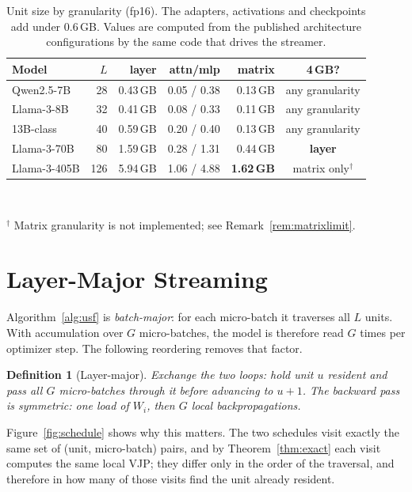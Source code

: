\documentclass[preprint,12pt]{elsarticle}
\newtheorem{definition}[theorem]{Definition}
\begin{document}
\begin{table}[t]
\centering
\caption{Unit size by granularity (fp16). The adapters, activations and checkpoints add under
0.6\,GB. Values are computed from the published architecture configurations by the same code that
drives the streamer.}
\label{tab:scaling}
\footnotesize
\setlength{\tabcolsep}{4pt}
\begin{tabular}{@{}lrrrrc@{}}
\toprule
\textbf{Model} & $L$ & \textbf{layer} & \textbf{attn/mlp} & \textbf{matrix} & \textbf{4\,GB?} \\
\midrule
Qwen2.5-7B    & 28  & 0.43\,GB & 0.05 / 0.38 & 0.13\,GB & any granularity \\
Llama-3-8B    & 32  & 0.41\,GB & 0.08 / 0.33 & 0.11\,GB & any granularity \\
13B-class     & 40  & 0.59\,GB & 0.20 / 0.40 & 0.13\,GB & any granularity \\
Llama-3-70B   & 80  & 1.59\,GB & 0.28 / 1.31 & 0.44\,GB & \textbf{layer} \\
Llama-3-405B  & 126 & 5.94\,GB & 1.06 / 4.88 & \textbf{1.62\,GB} & matrix only$^\dagger$ \\
\bottomrule
\end{tabular}
\\[2pt]
\raggedright\footnotesize $^\dagger$ Matrix granularity is not implemented; see
Remark~\ref{rem:matrixlimit}.
\end{table}

\section{Layer-Major Streaming}
\label{sec:lm}

Algorithm~\ref{alg:usf} is \emph{batch-major}: for each micro-batch it traverses all $L$ units. With
accumulation over $G$ micro-batches, the model is therefore read $G$ times per optimizer step. The
following reordering removes that factor.

\begin{definition}[Layer-major]
\label{def:lm}
Exchange the two loops: hold unit $u$ resident and pass all $G$ micro-batches through it before
advancing to $u+1$. The backward pass is symmetric: one load of $W_i$, then $G$ local
backpropagations.
\end{definition}

Figure~\ref{fig:schedule} shows why this matters. The two schedules visit exactly the same set of
(unit, micro-batch) pairs, and by Theorem~\ref{thm:exact} each visit computes the same local VJP; they
differ only in the order of the traversal, and therefore in how many of those visits find the unit
already resident.
\end{document}

